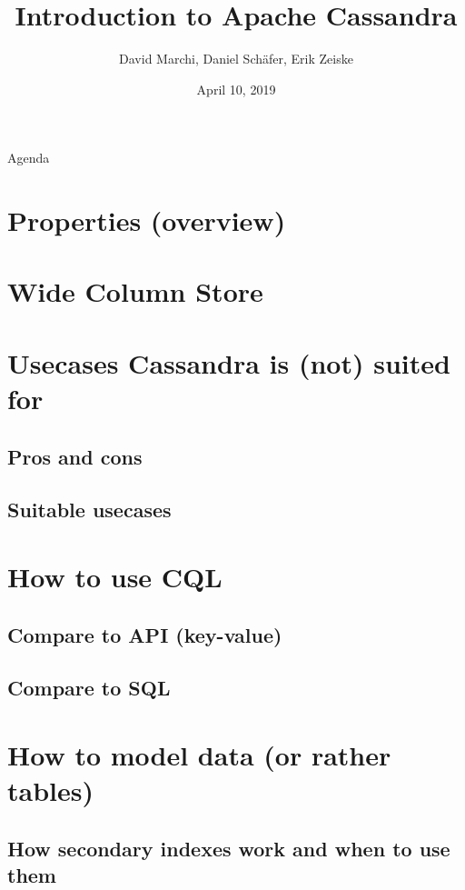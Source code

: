 \documentclass[10pt]{beamer}
\title{Introduction to Apache Cassandra}
\subtitle{}
\date{April 10, 2019}
\author{David Marchi, Daniel Schäfer, Erik Zeiske}
\begin{document}
\maketitle

\begin{frame}{Agenda}
  \tableofcontents
\end{frame}

\section{Properties (overview)}  %

\section{Wide Column Store}  %

\section{Usecases Cassandra is (not) suited for}  %
\subsection{Pros and cons}
\subsection{Suitable usecases}

\section{How to use CQL}  %
\subsection{Compare to API (key-value)}
\subsection{Compare to SQL}

\section{How to model data (or rather tables)}  %

\subsection{How secondary indexes work and when to use them}  %
\end{document}
